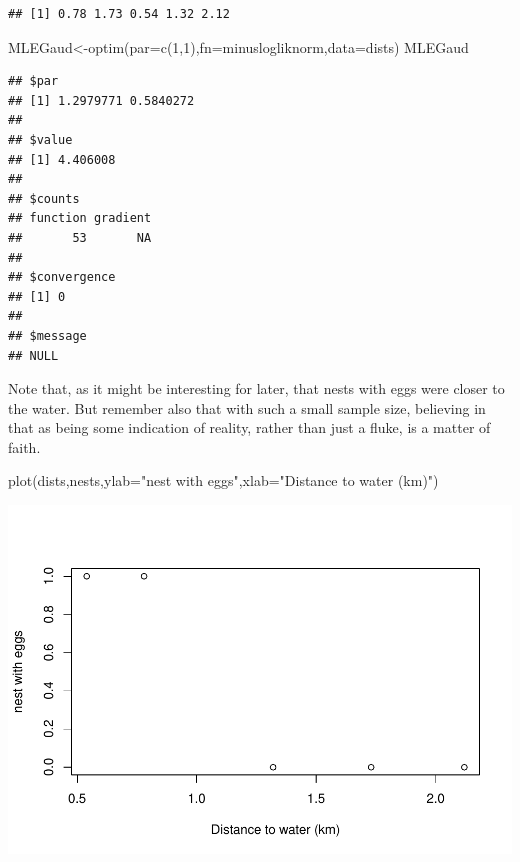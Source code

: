 \documentclass[
]{book}
\newenvironment{Shaded}{\begin{snugshade}}{\end{snugshade}}
\newcommand{\AttributeTok}[1]{\textcolor[rgb]{0.77,0.63,0.00}{#1}}
\newcommand{\DecValTok}[1]{\textcolor[rgb]{0.00,0.00,0.81}{#1}}
\newcommand{\FunctionTok}[1]{\textcolor[rgb]{0.00,0.00,0.00}{#1}}
\newcommand{\NormalTok}[1]{#1}
\newcommand{\OtherTok}[1]{\textcolor[rgb]{0.56,0.35,0.01}{#1}}
\newcommand{\StringTok}[1]{\textcolor[rgb]{0.31,0.60,0.02}{#1}}
\begin{document}
\begin{verbatim}
## [1] 0.78 1.73 0.54 1.32 2.12
\end{verbatim}

\begin{Shaded}
\begin{Highlighting}[]
\NormalTok{MLEGaud}\OtherTok{\textless{}{-}}\FunctionTok{optim}\NormalTok{(}\AttributeTok{par=}\FunctionTok{c}\NormalTok{(}\DecValTok{1}\NormalTok{,}\DecValTok{1}\NormalTok{),}\AttributeTok{fn=}\NormalTok{minuslogliknorm,}\AttributeTok{data=}\NormalTok{dists)}
\NormalTok{MLEGaud}
\end{Highlighting}
\end{Shaded}

\begin{verbatim}
## $par
## [1] 1.2979771 0.5840272
## 
## $value
## [1] 4.406008
## 
## $counts
## function gradient 
##       53       NA 
## 
## $convergence
## [1] 0
## 
## $message
## NULL
\end{verbatim}

Note that, as it might be interesting for later, that nests with eggs were closer to the water. But remember also that with such a small sample size, believing in that as being some indication of reality, rather than just a fluke, is a matter of faith.

\begin{Shaded}
\begin{Highlighting}[]
\FunctionTok{plot}\NormalTok{(dists,nests,}\AttributeTok{ylab=}\StringTok{"nest with eggs"}\NormalTok{,}\AttributeTok{xlab=}\StringTok{"Distance to water (km)"}\NormalTok{)}
\end{Highlighting}
\end{Shaded}

\includegraphics{ECOMODbook_files/figure-latex/ch13.24-1.pdf}
\end{document}
